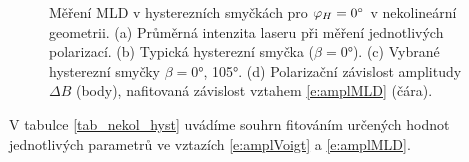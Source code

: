 \begin{figure}[htbp]\centering
{}
	\caption{Měření MLD v hysterezních smyčkách pro $\varphi_H=\ang{0}$ v nekolineární geometrii. (a) Průměrná intenzita laseru při měření jednotlivých polarizací. (b) Typická hysterezní smyčka ($\beta=\ang{0}$). (c) Vybrané hysterezní smyčky $\beta=\ang{0}$, \ang{105}. (d) Polarizační závislost amplitudy $\Delta B$ (body), nafitovaná závislost vztahem \eqref{e:amplMLD} (čára).}\label{nekol_vysledky0_mld}
\end{figure}

V tabulce \ref{tab_nekol_hyst} uvádíme souhrn fitováním určených hodnot jednotlivých parametrů ve vztazích \eqref{e:amplVoigt} a \eqref{e:amplMLD}.


